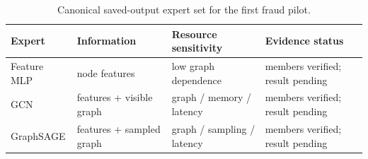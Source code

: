 \begin{table}[t]
\centering
\caption{Canonical saved-output expert set for the first fraud pilot.}
\label{tab:experts}
\small
\begin{tabular}{llll}
\toprule
Expert & Information & Resource sensitivity & Evidence status \\
\midrule
Feature MLP & node features & low graph dependence & members verified; result pending \\
GCN & features + visible graph & graph / memory / latency & members verified; result pending \\
GraphSAGE & features + sampled graph & graph / sampling / latency & members verified; result pending \\
\bottomrule
\end{tabular}
\end{table}
